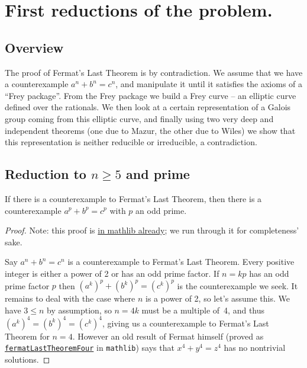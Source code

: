 \chapter{First reductions of the problem.}

\section{Overview}
The proof of Fermat's Last Theorem is by contradiction. We assume that we have a counterexample $a^n+b^n=c^n$, and manipulate it until it satisfies the axioms of a ``Frey package''. From the Frey package we build a Frey curve -- an elliptic curve defined over the rationals. We then look at a certain representation of a Galois group coming from this elliptic curve, and finally using two very deep and independent theorems (one due to Mazur, the other due to Wiles) we show that this representation is neither reducible or irreducible, a contradiction.

\section{Reduction to \texorpdfstring{$n\geq5$}{ngeq5} and prime}

\begin{lemma}\label{FermatLastTheorem.of_odd_primes}\leanok
  If there is a counterexample to Fermat's Last Theorem, then there is a counterexample $a^p+b^p=c^p$
  with $p$ an odd prime.
\end{lemma}
\begin{proof}\leanok
  Note: this proof is \href{https://leanprover-community.github.io/mathlib4_docs/Mathlib/NumberTheory/FLT/Four.html#FermatLastTheorem.of_odd_primes}{in mathlib already};
  we run through it for completeness' sake.

  Say $a^n + b^n = c^n$ is a counterexample to Fermat's Last Theorem. Every positive integer is either
  a power of 2 or has an odd prime factor. If $n=kp$ has an odd prime factor $p$ then
  $(a^k)^p+(b^k)^p=(c^k)^p$ is the counterexample we seek. It remains to deal with the case where
  $n$ is a power of 2, so let's assume this. We have $3\leq n$ by assumption, so
  $n=4k$ must be a multiple of~4, and thus $(a^k)^4=(b^k)^4=(c^k)^4$, giving us a counterexample
  to Fermat's Last Theorem for $n=4$. However an old result of Fermat himself (proved as \href{https://leanprover-community.github.io/mathlib4_docs/Mathlib/NumberTheory/FLT/Four.html#fermatLastTheoremFour}{\tt fermatLastTheoremFour} in {\tt mathlib}) says that $x^4+y^4=z^4$ has no nontrivial solutions.
\end{proof}

